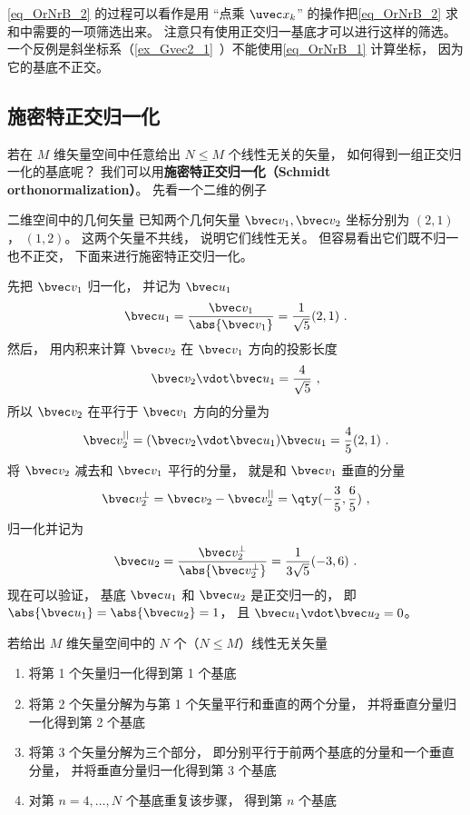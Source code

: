 \autoref{eq_OrNrB_2} 的过程可以看作是用 “点乘 $\uvec x_k$” 的操作把\autoref{eq_OrNrB_2} 求和中需要的一项筛选出来。 注意只有使用正交归一基底才可以进行这样的筛选。 一个反例是斜坐标系（\autoref{ex_Gvec2_1}~）不能使用\autoref{eq_OrNrB_1} 计算坐标， 因为它的基底不正交。


\subsection{施密特正交归一化}

若在 $M$ 维矢量空间中任意给出 $N \leqslant M$ 个线性无关的矢量， 如何得到一组正交归一化的基底呢？ 我们可以用\textbf{施密特正交归一化（Schmidt orthonormalization）}。 先看一个二维的例子

\begin{example}{二维空间中的几何矢量}
已知两个几何矢量 $\bvec v_1, \bvec v_2$ 坐标分别为 $(2, 1)$， $(1, 2)$。 这两个矢量不共线， 说明它们线性无关。 但容易看出它们既不归一也不正交， 下面来进行施密特正交归一化。

先把 $\bvec v_1$ 归一化， 并记为 $\bvec u_1$
\begin{equation}
\bvec u_1 = \frac{\bvec v_1}{\abs{\bvec v_1}} = \frac{1}{\sqrt{5}} (2, 1)~.
\end{equation}
然后， 用内积来计算 $\bvec v_2$ 在 $\bvec v_1$ 方向的投影长度
\begin{equation}
\bvec v_2 \vdot \bvec u_1 = \frac{4}{\sqrt{5}}~,
\end{equation}
所以 $\bvec v_2$ 在平行于 $\bvec v_1$ 方向的分量为
\begin{equation}
\bvec v_2^{||} =  (\bvec v_2 \vdot \bvec u_1)\bvec u_1 = \frac{4}{5} (2, 1)~.
\end{equation}
将 $\bvec v_2$ 减去和 $\bvec v_1$ 平行的分量， 就是和 $\bvec v_1$ 垂直的分量
\begin{equation}
\bvec v_2^\bot = \bvec v_2 - \bvec v_2^{||} = \qty(-\frac35, \frac65)~,
\end{equation}
归一化并记为
\begin{equation}
\bvec u_2 = \frac{\bvec v_2^\bot}{\abs{\bvec v_2^\bot}} = \frac{1}{3\sqrt{5}} (-3, 6)~.
\end{equation}
现在可以验证， 基底 $\bvec u_1$ 和 $\bvec u_2$ 是正交归一的， 即 $\abs{\bvec u_1} = \abs{\bvec u_2} = 1$， 且 $\bvec u_1 \vdot \bvec u_2 = 0$。
\end{example}

若给出 $M$ 维矢量空间中的 $N$ 个（$N \leqslant M$）线性无关矢量
\begin{enumerate}
\item 将第 1 个矢量归一化得到第 1 个基底
\item 将第 2 个矢量分解为与第 1 个矢量平行和垂直的两个分量， 并将垂直分量归一化得到第 2 个基底
\item 将第 3 个矢量分解为三个部分， 即分别平行于前两个基底的分量和一个垂直分量， 并将垂直分量归一化得到第 3 个基底
\item 对第 $n = 4, \dots , N$ 个基底重复该步骤， 得到第 $n$ 个基底
\end{enumerate}

